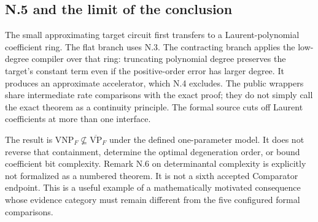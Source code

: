 \documentclass[11pt,letterpaper]{article}
\theoremstyle{definition}\newtheorem{definition}[theorem]{Definition}\newtheorem{example}[theorem]{Example}
\theoremstyle{remark}\newtheorem{remark}[theorem]{Remark}
\newcommand{\VP}{\mathrm{VP}}
\newcommand{\VNP}{\mathrm{VNP}}
\begin{document}
\subsection{N.5 and the limit of the conclusion}
The small approximating target circuit first transfers to a Laurent-polynomial coefficient ring. The flat branch uses N.3. The contracting branch applies the low-degree compiler over that ring: truncating polynomial degree preserves the target's constant term even if the positive-order error has larger degree. It produces an approximate accelerator, which N.4 excludes. The public wrappers share intermediate rate comparisons with the exact proof; they do not simply call the exact theorem as a continuity principle. The formal source cuts off Laurent coefficients at more than one interface.

The result is $\VNP_F\not\subseteq\overline{\VP}_F$ under the defined one-parameter model. It does not reverse that containment, determine the optimal degeneration order, or bound coefficient bit complexity. Remark N.6 on determinantal complexity is explicitly not formalized as a numbered theorem. It is not a sixth accepted Comparator endpoint. This is a useful example of a mathematically motivated consequence whose evidence category must remain different from the five configured formal comparisons.
\end{document}
